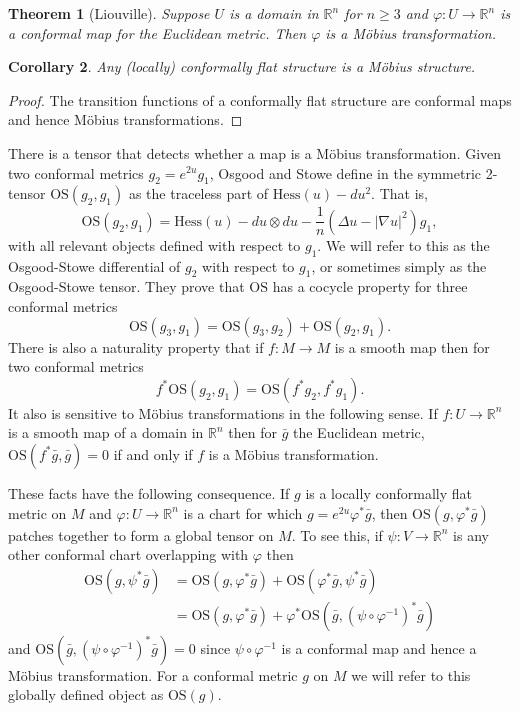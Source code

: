 \documentclass{amsart}
\newcommand{\R}{\mathbb{R}}
\newtheorem{thm}{Theorem}[section]
\newtheorem{cor}[thm]{Corollary}
\begin{document}
\begin{thm}[Liouville]
Suppose $U$ is a domain in $\R^n$ for $n \geq 3$ and $\varphi: U \to \R^n$ is a conformal map for the Euclidean metric. Then $\varphi$ is a M\"obius transformation.
\end{thm}
 

\begin{cor}
Any (locally) conformally flat structure is a M\"obius structure. 
\end{cor}
\begin{proof}
The transition functions of a conformally flat structure are conformal maps and hence M\"obius transformations.
\end{proof}

There is a tensor that detects whether a map is a M\"obius transformation. 
Given two conformal metrics $g_2 = e^{2u}g_1$, Osgood and Stowe define in \cite{Osgood-Stowe1992} the symmetric 2-tensor $\mathrm{OS}(g_2,g_1)$ as the traceless part of $\mathrm{Hess}(u) - du^2$.
That is, 
\[
\mathrm{OS}(g_2,g_1) = \mathrm{Hess}(u)  - du\otimes du - \frac{1}{n}\left( \Delta u - |\nabla u|^2\right)g_1,
\]
with all relevant objects defined with respect to $g_1$.
We will refer to this as the Osgood-Stowe differential of $g_2$ with respect to $g_1$, or sometimes simply as the Osgood-Stowe tensor.
They prove that $\mathrm{OS}$ has a cocycle property for three conformal metrics
\[
\mathrm{OS}(g_3,g_1) = \mathrm{OS}(g_3,g_2) + \mathrm{OS}(g_2,g_1).
\]
There is also a naturality property that if $f: M \to M$ is a smooth map then for two conformal metrics
\[
f^*\mathrm{OS}(g_2,g_1) = \mathrm{OS}(f^*g_2,f^*g_1).
\]
It also is sensitive to M\"obius transformations in the following sense. 
If $f:U \to \R^n$ is a smooth map of a domain in $\R^n$ then for $\bar{g}$ the Euclidean metric, $\mathrm{OS}(f^*\bar{g},\bar{g}) = 0$ if and only if $f$ is a M\"obius transformation.

These facts have the following consequence. 
If $g$ is a locally conformally flat metric on $M$ and $\varphi: U \to \R^n$ is a chart for which $g = e^{2u}\varphi^*\bar{g}$, then $\mathrm{OS}(g, \varphi^*\bar{g})$ patches together to form a global tensor on $M$. 
To see this, if $\psi: V \to \R^n$ is any other conformal chart overlapping with $\varphi$ then 
\begin{align*}
\mathrm{OS}(g ,\psi^*\bar{g}) 
&= \mathrm{OS}(g, \varphi^*\bar{g}) + \mathrm{OS}(\varphi^*\bar{g},\psi^*\bar{g}) \\
&= \mathrm{OS}(g, \varphi^*\bar{g}) + \varphi^*\mathrm{OS}(\bar{g},(\psi \circ \varphi^{-1})^*\bar{g})
\end{align*}
and $\mathrm{OS}(\bar{g},(\psi \circ \varphi^{-1})^*\bar{g}) = 0$ since $\psi \circ \varphi^{-1}$ is a conformal map and hence a M\"obius transformation.
For a conformal metric $g$ on $M$ we will refer to this globally defined object as $\mathrm{OS}(g)$.
\end{document}

